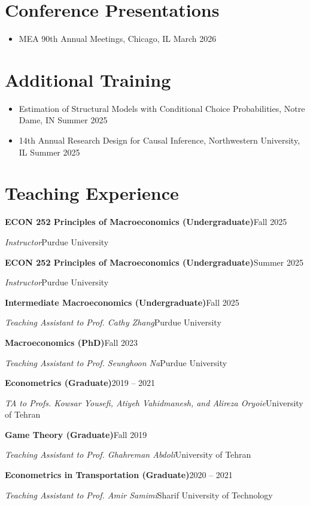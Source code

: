 \documentclass[11pt]{article}
\newcommand{\entry}[2]{%
  \needspace{2\baselineskip}%
  \textbf{#1}\hfill #2\par}
\newcommand{\role}[2]{\textit{#1}\hfill #2\par\vspace{0.2em}}
\newenvironment{tight}
  {\begin{itemize}[leftmargin=1.2em,topsep=0.1em,itemsep=0.15em,parsep=0pt]}
  {\end{itemize}}
\begin{document}
\section{Conference Presentations}
\begin{tight}
  \item MEA 90th Annual Meetings, Chicago, IL \hfill March 2026
\end{tight}

\section{Additional Training}
\begin{tight}
  \item Estimation of Structural Models with Conditional Choice Probabilities, Notre Dame, IN \hfill Summer 2025
  \item 14th Annual Research Design for Causal Inference, Northwestern University, IL \hfill Summer 2025
\end{tight}

\section{Teaching Experience}

\entry{ECON 252 Principles of Macroeconomics (Undergraduate)}{Fall 2025}
\role{Instructor}{Purdue University}

\entry{ECON 252 Principles of Macroeconomics (Undergraduate)}{Summer 2025}
\role{Instructor}{Purdue University}

\entry{Intermediate Macroeconomics (Undergraduate)}{Fall 2025}
\role{Teaching Assistant to Prof. Cathy Zhang}{Purdue University}

\entry{Macroeconomics (PhD)}{Fall 2023}
\role{Teaching Assistant to Prof. Seunghoon Na}{Purdue University}

\entry{Econometrics (Graduate)}{2019 -- 2021}
\role{TA to Profs. Kowsar Yousefi, Atiyeh Vahidmanesh, and Alireza Oryoie}{University of Tehran}

\entry{Game Theory (Graduate)}{Fall 2019}
\role{Teaching Assistant to Prof. Ghahreman Abdoli}{University of Tehran}

\entry{Econometrics in Transportation (Graduate)}{2020 -- 2021}
\role{Teaching Assistant to Prof. Amir Samimi}{Sharif University of Technology}
\end{document}
